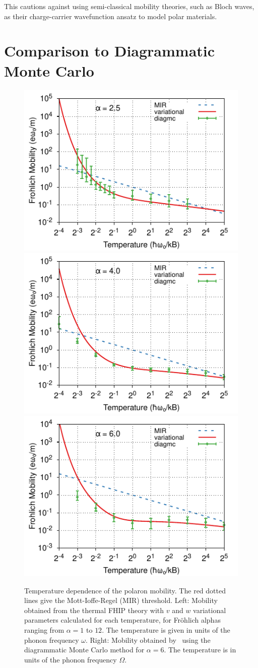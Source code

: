This cautions against using semi-classical mobility theories, such as Bloch waves, as their charge-carrier wavefunction ansatz to model polar materials. 

\section{Comparison to Diagrammatic Monte Carlo}

\begin{figure}[t]
    \centering
    \includegraphics[width=.49\textwidth]{figures/frohlich-3d-mobility-alpha-2.5-temp-00625to32-COLOUR.pdf}
    \includegraphics[width=.49\textwidth]{figures/frohlich-3d-mobility-alpha-4-temp-00625to32-COLOUR.pdf}
    \includegraphics[width=.49\textwidth]{figures/frohlich-3d-mobility-alpha-6-temp-00625to32-COLOUR.pdf}
    \caption{Temperature dependence of the polaron mobility. The red dotted lines give the Mott-Ioffe-Regel (MIR) threshold. Left: Mobility obtained from the thermal FHIP theory with $v$ and $w$ variational parameters calculated for each temperature, for Fr\"ohlich alphas ranging from $\alpha = 1$ to  $12$. The temperature is given in units of the phonon frequency $\omega$. Right: Mobility obtained by~\cite{mishchenko_polaron_2019} using the diagrammatic Monte Carlo method for $\alpha = 6$. The temperature is in units of the phonon frequency $\Omega$.}
    \label{fig:mishchenko2}
\end{figure}

